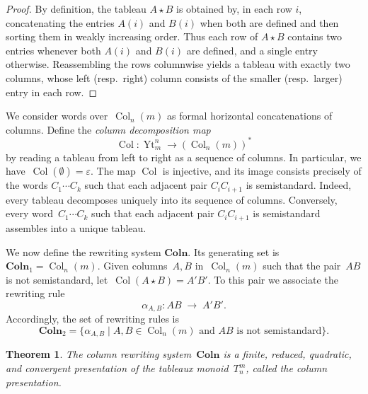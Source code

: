 \documentclass[a4paper, twoside, 11pt, english]{article}
\theoremstyle{plain}
\newtheorem{theorem}[subsubsection]{Theorem}
\theoremstyle{definition}
\newcommand{\fl}{\rightarrow}
\DeclareMathOperator{\YoungT}{Yt}
\DeclareMathOperator{\col}{Col}
\newcommand{\Colo}{\mathbf{Coln}}
\begin{document}
\begin{proof}
By definition, the tableau $A \star B$ is obtained by, in each row $i$,
concatenating the entries $A(i)$ and $B(i)$ when both are defined and then
sorting them in weakly increasing order.
Thus each row of $A \star B$ contains two entries whenever both $A(i)$ and
$B(i)$ are defined, and a single entry otherwise.
Reassembling the rows columnwise yields a tableau with exactly two columns,
whose left (resp.~right) column consists of the smaller (resp.~larger)
entry in each row.
\end{proof}

We consider words over~$\col_n(m)$ as formal horizontal concatenations of columns.
Define the \emph{column decomposition map}
\[
\col : \YoungT_m^n \longrightarrow (\col_n(m))^\ast
\]
by reading a tableau from left to right as a sequence of columns. In particular, we have~$\col(\emptyset)=\varepsilon$.
The map $\col$ is injective, and its image consists precisely of the
words $C_1\cdots C_k$ such that each adjacent pair $C_iC_{i+1}$ is
semistandard.
Indeed, every tableau decomposes uniquely into its sequence of columns.
Conversely, every word~$C_1\cdots C_k$ such that each adjacent pair
$C_iC_{i+1}$ is semistandard assembles into a unique tableau.

We now define the rewriting system $\Colo$.
Its generating set is~$\Colo_1=\col_n(m)$.
Given columns~$A,B$ in~$\col_n(m)$ such that the pair~$AB$ is not
semistandard, let~$\col(A\star B)=A'B'$.
To this pair we associate the rewriting rule
\[
\alpha_{A,B}: AB \;\fl\; A'B'.
\]
Accordingly, the set of rewriting rules is
\[
\Colo_2=
\{\alpha_{A,B}\mid A,B\in\col_n(m)\text{ and }AB\text{ is not semistandard}\}.
\]


\begin{theorem}
\label{thm:ColumnPresentation}
The column rewriting system~$\Colo$ is a finite, reduced, quadratic, and convergent
presentation of the tableaux monoid~$T_n^m$, called the \emph{column presentation}.
\end{theorem}
\end{document}

